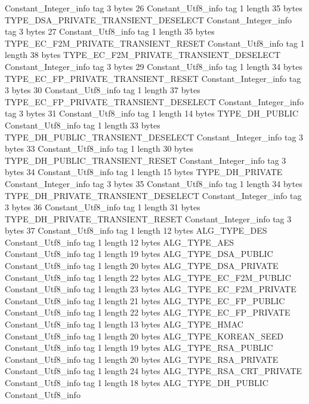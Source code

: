 {{{		}
		Constant_Integer_info {
			tag	3
			bytes	26
		}
		Constant_Utf8_info {
			tag	1
			length	35
			bytes	TYPE_DSA_PRIVATE_TRANSIENT_DESELECT
		}
		Constant_Integer_info {
			tag	3
			bytes	27
		}
		Constant_Utf8_info {
			tag	1
			length	35
			bytes	TYPE_EC_F2M_PRIVATE_TRANSIENT_RESET
		}
		Constant_Utf8_info {
			tag	1
			length	38
			bytes	TYPE_EC_F2M_PRIVATE_TRANSIENT_DESELECT
		}
		Constant_Integer_info {
			tag	3
			bytes	29
		}
		Constant_Utf8_info {
			tag	1
			length	34
			bytes	TYPE_EC_FP_PRIVATE_TRANSIENT_RESET
		}
		Constant_Integer_info {
			tag	3
			bytes	30
		}
		Constant_Utf8_info {
			tag	1
			length	37
			bytes	TYPE_EC_FP_PRIVATE_TRANSIENT_DESELECT
		}
		Constant_Integer_info {
			tag	3
			bytes	31
		}
		Constant_Utf8_info {
			tag	1
			length	14
			bytes	TYPE_DH_PUBLIC
		}
		Constant_Utf8_info {
			tag	1
			length	33
			bytes	TYPE_DH_PUBLIC_TRANSIENT_DESELECT
		}
		Constant_Integer_info {
			tag	3
			bytes	33
		}
		Constant_Utf8_info {
			tag	1
			length	30
			bytes	TYPE_DH_PUBLIC_TRANSIENT_RESET
		}
		Constant_Integer_info {
			tag	3
			bytes	34
		}
		Constant_Utf8_info {
			tag	1
			length	15
			bytes	TYPE_DH_PRIVATE
		}
		Constant_Integer_info {
			tag	3
			bytes	35
		}
		Constant_Utf8_info {
			tag	1
			length	34
			bytes	TYPE_DH_PRIVATE_TRANSIENT_DESELECT
		}
		Constant_Integer_info {
			tag	3
			bytes	36
		}
		Constant_Utf8_info {
			tag	1
			length	31
			bytes	TYPE_DH_PRIVATE_TRANSIENT_RESET
		}
		Constant_Integer_info {
			tag	3
			bytes	37
		}
		Constant_Utf8_info {
			tag	1
			length	12
			bytes	ALG_TYPE_DES
		}
		Constant_Utf8_info {
			tag	1
			length	12
			bytes	ALG_TYPE_AES
		}
		Constant_Utf8_info {
			tag	1
			length	19
			bytes	ALG_TYPE_DSA_PUBLIC
		}
		Constant_Utf8_info {
			tag	1
			length	20
			bytes	ALG_TYPE_DSA_PRIVATE
		}
		Constant_Utf8_info {
			tag	1
			length	22
			bytes	ALG_TYPE_EC_F2M_PUBLIC
		}
		Constant_Utf8_info {
			tag	1
			length	23
			bytes	ALG_TYPE_EC_F2M_PRIVATE
		}
		Constant_Utf8_info {
			tag	1
			length	21
			bytes	ALG_TYPE_EC_FP_PUBLIC
		}
		Constant_Utf8_info {
			tag	1
			length	22
			bytes	ALG_TYPE_EC_FP_PRIVATE
		}
		Constant_Utf8_info {
			tag	1
			length	13
			bytes	ALG_TYPE_HMAC
		}
		Constant_Utf8_info {
			tag	1
			length	20
			bytes	ALG_TYPE_KOREAN_SEED
		}
		Constant_Utf8_info {
			tag	1
			length	19
			bytes	ALG_TYPE_RSA_PUBLIC
		}
		Constant_Utf8_info {
			tag	1
			length	20
			bytes	ALG_TYPE_RSA_PRIVATE
		}
		Constant_Utf8_info {
			tag	1
			length	24
			bytes	ALG_TYPE_RSA_CRT_PRIVATE
		}
		Constant_Utf8_info {
			tag	1
			length	18
			bytes	ALG_TYPE_DH_PUBLIC
		}
		Constant_Utf8_info {
}}}
